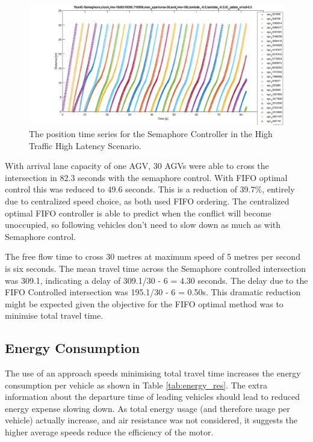 \documentclass[]{article}
\begin{document}
\begin{figure}
	\includegraphics[width=1.0\linewidth]{Sempahore-716956HighTraffic-HighLatency.eps}
	\caption{The position time series for the Semaphore Controller in the High Traffic High Latency Scenario.}
	\label{fig:semaphore_st_HL_HT}       %
\end{figure}

With arrival lane capacity of one AGV, 30 AGVs were able to cross the intersection in 82.3 seconds with the semaphore control. With FIFO optimal control this was reduced to 49.6 seconds. This is a reduction of 39.7\%, entirely due to centralized speed choice, as both used FIFO ordering. The centralized optimal FIFO controller is able to predict when the conflict will become unoccupied, so following vehicles don't need to slow down as much as with Semaphore control. 

The free flow time to cross 30 metres at maximum speed of 5 metres per second is six seconds. The mean travel time across the Semaphore controlled intersection was 309.1, indicating a delay of 309.1/30 - 6 = 4.30 seconds. The delay due to the FIFO Controlled intersection was 195.1/30 - 6 = 0.50s. This dramatic reduction might be expected given the objective for the FIFO optimal method was to minimise total travel time.   

\subsection{Energy Consumption}
The use of an approach speeds minimising total travel time increases the energy consumption per vehicle as shown in Table \ref{tab:energy_res}. The extra information about the departure time of leading vehicles should lead to reduced energy expense slowing down. As total energy usage (and therefore usage per vehicle) actually increase, and air resistance was not considered,  it suggests the higher average speeds reduce the efficiency of the motor.
\end{document}
